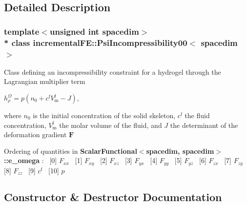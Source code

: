 \subsection{Detailed Description}
\subsubsection*{template$<$unsigned int spacedim$>$\\*
class incremental\+F\+E\+::\+Psi\+Incompressibility00$<$ spacedim $>$}

Class defining an incompressibility constraint for a hydrogel through the Lagrangian multiplier term

$h^\Omega_\rho = p\left( n_0 + c^\mathrm{f} V^\mathrm{f}_\mathrm{m} - J \right)$,

where $n_0$ is the initial concentration of the solid skeleton, $c^\mathrm{f}$ the fluid concentration, $V^\mathrm{f}_\mathrm{m}$ the molar volume of the fluid, and $J$ the determinant of the deformation gradient $\boldsymbol{F}$

Ordering of quantities in {\bf Scalar\+Functional$<$spacedim, spacedim$>$\+::e\+\_\+omega} \+:~\newline
 \mbox{[}0\mbox{]} $F_{xx}$~\newline
 \mbox{[}1\mbox{]} $F_{xy}$~\newline
 \mbox{[}2\mbox{]} $F_{xz}$~\newline
 \mbox{[}3\mbox{]} $F_{yx}$~\newline
 \mbox{[}4\mbox{]} $F_{yy}$~\newline
 \mbox{[}5\mbox{]} $F_{yz}$~\newline
 \mbox{[}6\mbox{]} $F_{zx}$~\newline
 \mbox{[}7\mbox{]} $F_{zy}$~\newline
 \mbox{[}8\mbox{]} $F_{zz}$~\newline
 \mbox{[}9\mbox{]} $c^\mathrm{f}$~\newline
 \mbox{[}10\mbox{]} $p$ 

\subsection{Constructor \& Destructor Documentation}
